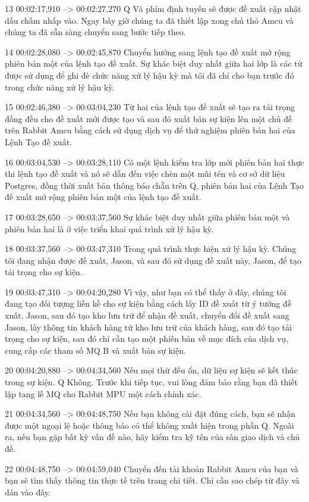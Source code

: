 13
00:02:17,910 --> 00:02:27,270
Q Và phím định tuyến sẽ được đề xuất cập nhật dấu chấm nhấp vào.  Ngay bây giờ chúng ta đã thiết lập xong chú thỏ Amcu và chúng ta đã sẵn sàng chuyển sang bước tiếp theo.

14
00:02:28,080 --> 00:02:45,870
Chuyển hướng sang lệnh tạo đề xuất mở rộng phiên bản một của lệnh tạo đề xuất.  Sự khác biệt duy nhất giữa hai lớp là các từ được sử dụng để ghi đè chức năng xử lý hậu kỳ mà tôi đã chỉ cho bạn trước đó trong chức năng xử lý hậu kỳ.

15
00:02:46,380 --> 00:03:04,230
Từ hai của lệnh tạo đề xuất sẽ tạo ra tải trọng đồng đều cho đề xuất mới được tạo và sau đó xuất bản sự kiện lên một chủ đề trên Rabbit Amcu bằng cách sử dụng dịch vụ để thử nghiệm phiên bản hai của Lệnh Tạo đề xuất.

16
00:03:04,530 --> 00:03:28,110
Có một lệnh kiểm tra lớp mới phiên bản hai thực thi lệnh tạo đề xuất và nó sẽ dẫn đến việc chèn một mũi tên và cơ sở dữ liệu Postgres, đồng thời xuất bản thông báo chẵn trên Q, phiên bản hai của Lệnh Tạo đề xuất mở rộng  phiên bản một của lệnh tạo đề xuất.

17
00:03:28,650 --> 00:03:37,560
Sự khác biệt duy nhất giữa phiên bản một và phiên bản hai là ở việc triển khai quá trình xử lý hậu kỳ.

18
00:03:37,560 --> 00:03:47,310
Trong quá trình thực hiện xử lý hậu kỳ.  Chúng tôi đang nhận được đề xuất, Jason, và sau đó sử dụng đề xuất này, Jason, để tạo tải trọng cho sự kiện.

19
00:03:47,310 --> 00:04:20,280
Vì vậy, như bạn có thể thấy ở đây, chúng tôi đang tạo đối tượng liền kề cho sự kiện bằng cách lấy ID đề xuất từ ​​ý tưởng đề xuất, Jason, sau đó tạo kho lưu trữ để nhận đề xuất, chuyển đổi đề xuất sang Jason, lấy thông tin khách hàng từ  kho lưu trữ của khách hàng, sau đó tạo tải trọng cho sự kiện, sau đó chỉ cần tạo một phiên bản về mục đích của dịch vụ, cung cấp các tham số MQ B và xuất bản sự kiện.

20
00:04:20,880 --> 00:04:34,560
Nếu mọi thứ đều ổn, dữ liệu sự kiện sẽ kết thúc trong sự kiện.  Q Không. Trước khi tiếp tục, vui lòng đảm bảo rằng bạn đã thiết lập tang lễ MQ cho Rabbit MPU một cách chính xác.

21
00:04:34,560 --> 00:04:48,750
Nếu bạn không cài đặt đúng cách, bạn sẽ nhận được một ngoại lệ hoặc thông báo có thể không xuất hiện trong phần Q. Ngoài ra, nếu bạn gặp bất kỳ vấn đề nào, hãy kiểm tra kỹ tên của sàn giao dịch và chủ đề.

22
00:04:48,750 --> 00:04:59,040
Chuyển đến tài khoản Rabbit Amcu của bạn và bạn sẽ tìm thấy thông tin thực tế trên trang chi tiết.  Chỉ cần sao chép từ đây và dán vào đây.

